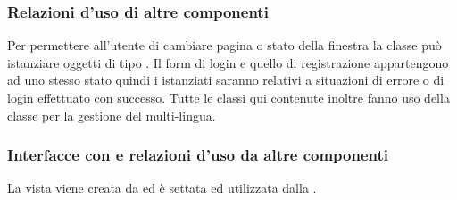 \subsubsection*{Relazioni d'uso di altre componenti}
Per permettere all'utente di cambiare pagina o stato della finestra la classe
pu\`o istanziare oggetti di tipo . Il form di login e quello di
registrazione appartengono ad uno stesso stato quindi i 
istanziati saranno relativi a situazioni di errore o di login effettuato con successo. 
Tutte le classi qui contenute inoltre fanno uso della classe 
per la gestione del multi-lingua. 
\subsubsection*{Interfacce con e relazioni d'uso da altre componenti} La vista
viene creata da  ed \`e settata ed utilizzata dalla
. 

